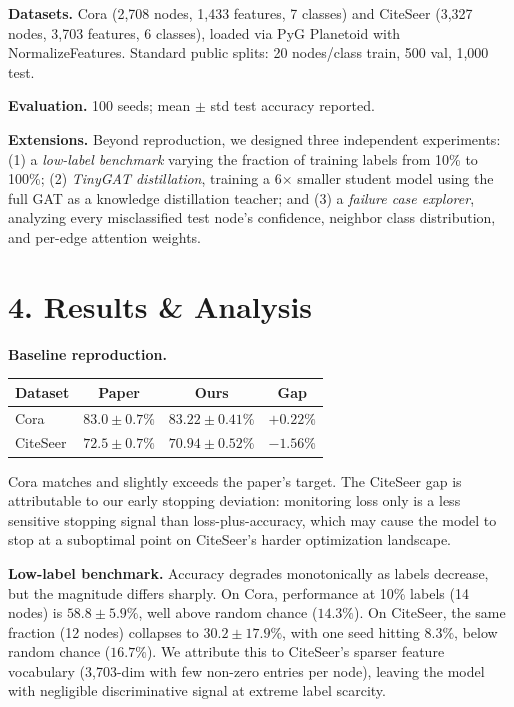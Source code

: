 \documentclass[11pt]{article}
\begin{document}
\textbf{Datasets.} Cora (2,708 nodes, 1,433 features, 7 classes) and CiteSeer (3,327 nodes, 3,703 features, 6 classes), loaded via PyG Planetoid with NormalizeFeatures. Standard public splits: 20 nodes/class train, 500 val, 1,000 test.

\textbf{Evaluation.} 100 seeds; mean $\pm$ std test accuracy reported.

\textbf{Extensions.} Beyond reproduction, we designed three independent experiments: (1) a \textit{low-label benchmark} varying the fraction of training labels from 10\% to 100\%; (2) \textit{TinyGAT distillation}, training a 6$\times$ smaller student model using the full GAT as a knowledge distillation teacher; and (3) a \textit{failure case explorer}, analyzing every misclassified test node's confidence, neighbor class distribution, and per-edge attention weights.

\section*{4. Results \& Analysis}

\textbf{Baseline reproduction.}

\begin{table}[H]
\centering
\small
\begin{tabular}{lccc}
\toprule
Dataset & Paper & Ours & Gap \\
\midrule
Cora & $83.0 \pm 0.7\%$ & $\mathbf{83.22 \pm 0.41\%}$ & $+0.22\%$ \\
CiteSeer & $72.5 \pm 0.7\%$ & $70.94 \pm 0.52\%$ & $-1.56\%$ \\
\bottomrule
\end{tabular}
\end{table}

Cora matches and slightly exceeds the paper's target. The CiteSeer gap is attributable to our early stopping deviation: monitoring loss only is a less sensitive stopping signal than loss-plus-accuracy, which may cause the model to stop at a suboptimal point on CiteSeer's harder optimization landscape.

\textbf{Low-label benchmark.} Accuracy degrades monotonically as labels decrease, but the magnitude differs sharply. On Cora, performance at 10\% labels (14 nodes) is $58.8 \pm 5.9\%$, well above random chance ($14.3\%$). On CiteSeer, the same fraction (12 nodes) collapses to $30.2 \pm 17.9\%$, with one seed hitting $8.3\%$, below random chance ($16.7\%$). We attribute this to CiteSeer's sparser feature vocabulary (3,703-dim with few non-zero entries per node), leaving the model with negligible discriminative signal at extreme label scarcity.
\end{document}
